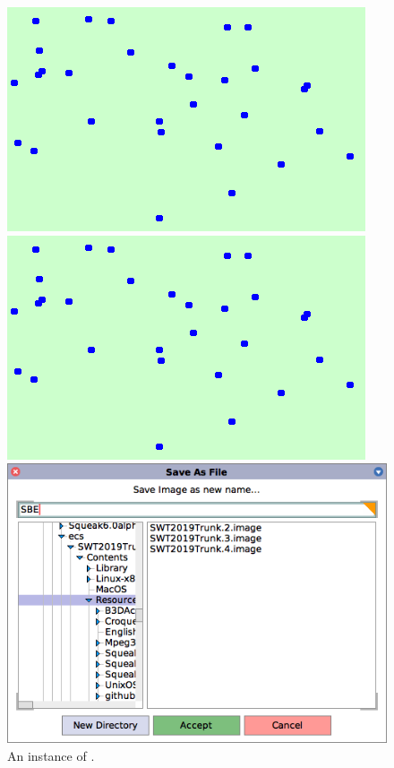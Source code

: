 \documentclass[a4paper,10pt,twoside]{book}
\begin{document}
\begin{figure}[htb]
\begin{minipage}[b]{0.48\textwidth}
\ifluluelse
	{\centerline{\includegraphics[scale=0.5]{BouncingAtoms}}}
	{\centerline{\includegraphics[scale=0.7]{BouncingAtoms}}}
	\caption{An instance of .\label{fig:blob}}
\end{minipage}
\hfill
\begin{minipage}[b]{0.48\textwidth}
\ifluluelse
	{\centerline {\includegraphics[scale=0.5]{saveAs}}}

\end{minipage}
\end{figure}
\end{document}
